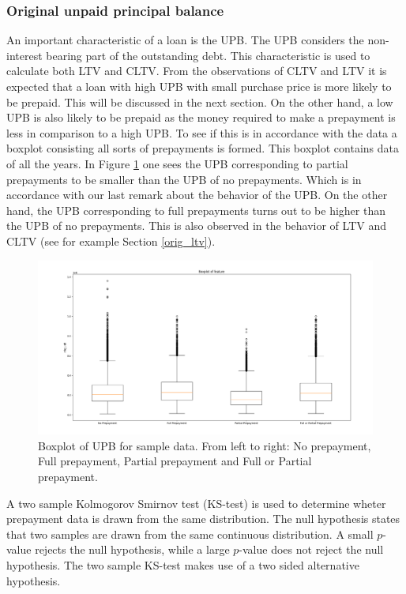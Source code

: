     \subsubsection{Original unpaid principal balance}
        An important characteristic of a loan is the UPB.
        The UPB considers the non-interest bearing part of the 
        outstanding debt.  
        This characteristic 
        is used to calculate both LTV and CLTV. From the 
        observations of CLTV and LTV it is expected that a loan 
        with high UPB with small purchase price is more likely 
        to be prepaid. This will be discussed in the next section. 
        On the other hand, a low UPB is also likely to be 
        prepaid as the money required to make a prepayment is 
        less in comparison to a high UPB. To see if this is in 
        accordance with the data a boxplot consisting all 
        sorts of prepayments is formed. This boxplot contains 
        data of all the years.  In Figure 
        \ref{model_boxplot_UPB} one sees the UPB corresponding 
        to partial prepayments to be smaller than the UPB of no 
        prepayments. Which is in accordance with our last remark 
        about the behavior of the UPB. On the other hand, the 
        UPB corresponding to full prepayments turns out to be 
        higher than the UPB of no prepayments. This is also 
        observed in the behavior of LTV and CLTV (see 
        for example Section \ref{orig_ltv}). 
        \begin{figure}[H]
            \centering
            \includegraphics[width=\linewidth]{Figures/Boxplot_of_upb_[2013, 2014, 2015, 2016, 2017, 2018, 2019, 2020]_.png}
            \caption{
                Boxplot of UPB for sample data. From left to right: 
                No prepayment, Full prepayment, Partial prepayment 
                and Full or Partial prepayment.
                }
            \label{model_boxplot_UPB}
        \end{figure}
        \noindent
        A two sample Kolmogorov Smirnov test (KS-test) is used to
        determine wheter prepayment data is drawn from the same
        distribution. The null hypothesis states that two samples are drawn from the same continuous distribution. A small $p$-value rejects the null hypothesis, while a large $p$-value does not reject the null hypothesis. The two sample KS-test makes use of a two sided alternative hypothesis. 
        
